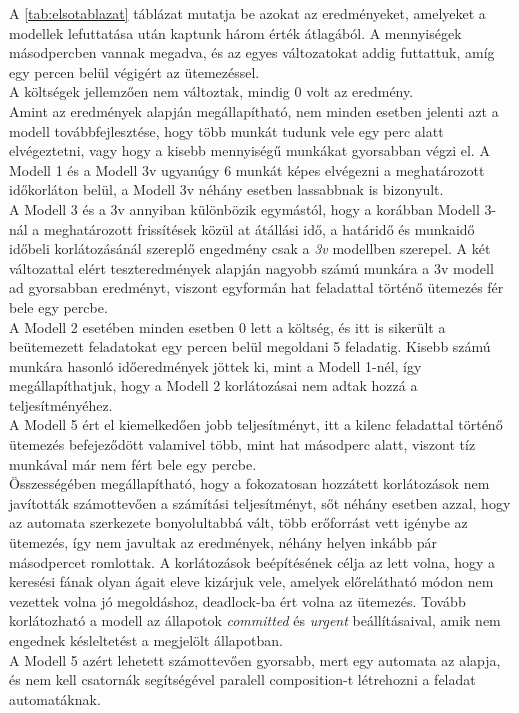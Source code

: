 \documentclass [12pt]{report}
\begin{document}
   A \ref{tab:elsotablazat} táblázat mutatja be azokat az eredményeket, amelyeket a modellek lefuttatása után kaptunk három érték átlagából. A mennyiségek másodpercben vannak megadva, és az egyes változatokat addig futtattuk, amíg egy percen belül végigért az ütemezéssel.\\
   A költségek jellemzően nem változtak, mindig 0 volt az eredmény.\\
   Amint az eredmények alapján megállapítható, nem minden esetben jelenti azt a modell továbbfejlesztése, hogy több munkát tudunk vele egy perc alatt elvégeztetni, vagy hogy a kisebb mennyiségű munkákat gyorsabban végzi el. A Modell 1 és a Modell 3v ugyanúgy 6 munkát képes elvégezni a meghatározott időkorláton belül, a Modell 3v néhány esetben lassabbnak is bizonyult.\\
   A Modell 3 és a 3v annyiban különbözik egymástól, hogy a korábban Modell 3-nál a meghatározott frissítések közül at átállási idő, a határidő és munkaidő időbeli korlátozásánál szereplő engedmény csak a \emph{3v} modellben szerepel. A két változattal elért teszteredmények alapján nagyobb számú munkára a 3v modell ad gyorsabban eredményt, viszont egyformán hat feladattal történő ütemezés fér bele egy percbe.\\
   A Modell 2 esetében minden esetben 0 lett a költség, és itt is sikerült a beütemezett feladatokat egy percen belül megoldani 5 feladatig. Kisebb számú munkára hasonló időeredmények jöttek ki, mint a Modell 1-nél, így megállapíthatjuk, hogy a Modell 2 korlátozásai nem adtak hozzá a teljesítményéhez. \\
   A Modell 5 ért el kiemelkedően jobb teljesítményt, itt a kilenc feladattal történő ütemezés befejeződött valamivel több, mint hat másodperc alatt, viszont tíz munkával már nem fért bele egy percbe.\\
   Összességében megállapítható, hogy a fokozatosan hozzátett korlátozások nem javították számottevően a számítási teljesítményt, sőt néhány esetben azzal, hogy az automata szerkezete bonyolultabbá vált, több erőforrást vett igénybe az ütemezés, így nem javultak az eredmények, néhány helyen inkább pár másodpercet romlottak. A korlátozások beépítésének célja az lett volna, hogy a keresési fának olyan ágait eleve kizárjuk vele, amelyek előrelátható módon nem vezettek volna jó megoldáshoz, deadlock-ba ért volna az ütemezés. Tovább korlátozható a modell az állapotok \emph{committed} és \emph{urgent} beállításaival, amik nem engednek késleltetést a megjelölt állapotban.\\ 
   A Modell 5 azért lehetett számottevően gyorsabb, mert egy automata az alapja, és nem kell csatornák segítségével paralell composition-t létrehozni a feladat automatáknak. 
\end{document}
